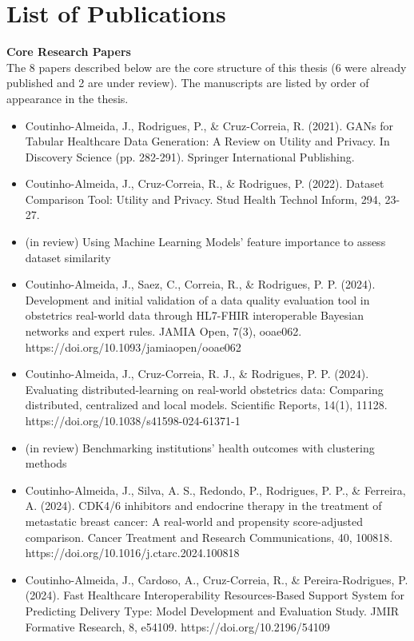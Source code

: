 \chapter*{List of Publications}



\textbf{Core Research Papers} \\
The 8 papers described below are the core structure of this thesis (6 were already published and 2 are under review). The manuscripts are listed by order of appearance in the thesis.
\\
\begin{itemize}
    \item Coutinho-Almeida, J., Rodrigues, P., \& Cruz-Correia, R. (2021). GANs for Tabular Healthcare Data Generation: A Review on Utility and Privacy. In Discovery Science (pp. 282-291). Springer International Publishing.

    \item Coutinho-Almeida, J., Cruz-Correia, R., \& Rodrigues, P. (2022). Dataset Comparison Tool: Utility and Privacy. Stud Health Technol Inform, 294, 23-27.
    

    \item (in review) Using Machine Learning Models' feature importance to assess dataset similarity 


    \item Coutinho-Almeida, J., Saez, C., Correia, R., \& Rodrigues, P. P. (2024). Development and initial validation of a data quality evaluation tool in obstetrics real-world data through HL7-FHIR interoperable Bayesian networks and expert rules. JAMIA Open, 7(3), ooae062. https://doi.org/10.1093/jamiaopen/ooae062

    
    \item Coutinho-Almeida, J., Cruz-Correia, R. J., \& Rodrigues, P. P. (2024). Evaluating distributed-learning on real-world obstetrics data: Comparing distributed, centralized and local models. Scientific Reports, 14(1), 11128. https://doi.org/10.1038/s41598-024-61371-1

    
    \item (in review) Benchmarking institutions' health outcomes with clustering methods 

    
    \item Coutinho-Almeida, J., Silva, A. S., Redondo, P., Rodrigues, P. P., \& Ferreira, A. (2024). CDK4/6 inhibitors and endocrine therapy in the treatment of metastatic breast cancer: A real-world and propensity score-adjusted comparison. Cancer Treatment and Research Communications, 40, 100818. https://doi.org/10.1016/j.ctarc.2024.100818

     
    
    \item Coutinho-Almeida, J., Cardoso, A., Cruz-Correia, R., \& Pereira-Rodrigues, P. (2024). Fast Healthcare Interoperability Resources-Based Support System for Predicting Delivery Type: Model Development and Evaluation Study. JMIR Formative Research, 
    8, e54109. https://doi.org/10.2196/54109

\end{itemize}



